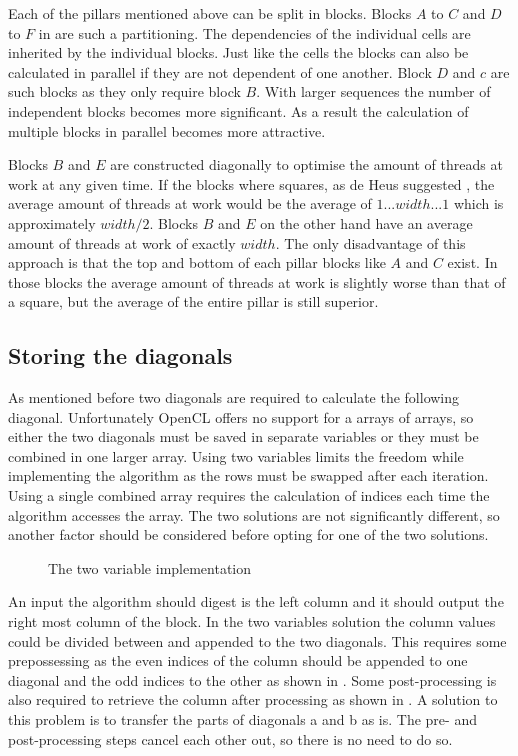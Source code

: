 Each of the pillars mentioned above can be split in blocks.
Blocks $A$ to $C$ and $D$ to $F$ in  are such a partitioning.
The dependencies of the individual cells are inherited by the individual blocks.
Just like the cells the blocks can also be calculated in parallel if they are not dependent of one another.
Block $D$ and $c$ are such blocks as they only require block $B$.
With larger sequences the number of independent blocks becomes more significant.
As a result the calculation of multiple blocks in parallel becomes more attractive.

Blocks $B$ and $E$ are constructed diagonally to optimise the amount of threads at work at any given time.
If the blocks where squares, as de Heus suggested \cite{Heus}, the average amount of threads at work would be the average of $1...width...1$ which is approximately $width/2$.
Blocks $B$ and $E$ on the other hand have an average amount of threads at work of exactly $width$.
The only disadvantage of this approach is that the top and bottom of each pillar blocks like $A$ and $C$ exist.
In those blocks the average amount of threads at work is slightly worse than that of a square, but the average of the entire pillar is still superior.

\subsection{Storing the diagonals} \label{section:diagonal}
As mentioned before two diagonals are required to calculate the following diagonal.
Unfortunately OpenCL offers no support for a arrays of arrays, so either the two diagonals must be saved in separate variables or they must be combined in one larger array.
Using two variables limits the freedom while implementing the algorithm as the rows must be swapped after each iteration.
Using a single combined array requires the calculation of indices each time the algorithm accesses the array.
The two solutions are not significantly different, so another factor should be considered before opting for one of the two solutions.

\begin{figure}%
    \centering
    \subfloat[][Input]{\label{twovarsinput}}%
    \subfloat[][Output]{\label{twovarsoutput}}
    \caption{The two variable implementation} \label{twovars}
\end{figure}

An input the algorithm should digest is the left column and it should output the right most column of the block.
In the two variables solution the column values could be divided between and appended to the two diagonals.
This requires some prepossessing as the even indices of the column should be appended to one diagonal and the odd indices to the other as shown in .
Some post-processing is also required to retrieve the column after processing as shown in .
A solution to this problem is to transfer the parts of diagonals a and b as is.
The pre- and post-processing steps cancel each other out, so there is no need to do so.


